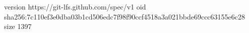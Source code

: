 version https://git-lfs.github.com/spec/v1
oid sha256:7c110ef3e0dba03b1cd506edc7f98f90ccf4518a3a021bbde69ccc63155e6c28
size 1397
